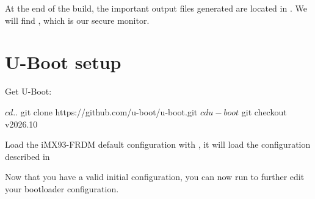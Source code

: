 
At the end of the build, the important output files generated are
located in . We will find ,
which is our secure monitor.

\section{U-Boot setup}

Get U-Boot:

\begin{bashinput}
$ cd ..
$ git clone https://github.com/u-boot/u-boot.git
$ cd u-boot
$ git checkout v2026.10
\end{bashinput}

Load the iMX93-FRDM default configuration with
, it will load the configuration
described in 

Now that you have a valid initial configuration, you can now run
 to further edit your bootloader
configuration.

